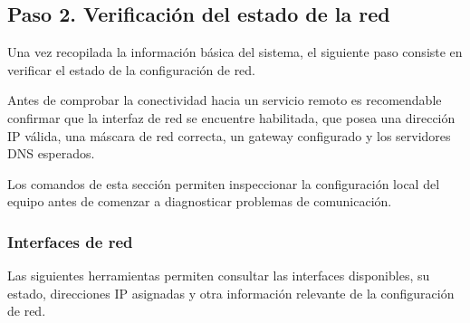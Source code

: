 \documentclass[a4paper,10pt]{article}
\begin{document}

\subsection{Paso 2. Verificación del estado de la red}

Una vez recopilada la información básica del sistema, el siguiente paso consiste
en verificar el estado de la configuración de red.

Antes de comprobar la conectividad hacia un servicio remoto es recomendable
confirmar que la interfaz de red se encuentre habilitada, que posea una dirección
IP válida, una máscara de red correcta, un gateway configurado y los servidores
DNS esperados.

Los comandos de esta sección permiten inspeccionar la configuración local del
equipo antes de comenzar a diagnosticar problemas de comunicación.


\subsubsection{Interfaces de red}

Las siguientes herramientas permiten consultar las interfaces disponibles,
su estado, direcciones IP asignadas y otra información relevante de la configuración
de red.
\end{document}

